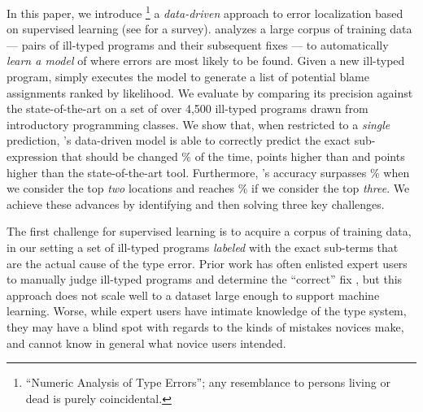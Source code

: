 %
In this paper, we introduce \toolname
\footnote{``Numeric Analysis of Type Errors''; any resemblance to persons living or dead is purely coincidental.}
a \emph{data-driven} approach to error
localization based on supervised
learning (see \citealt{Kotsiantis2007-pj} for a survey).
%
\toolname analyzes a large corpus
of training data --- pairs of ill-typed
programs and their subsequent fixes ---
to automatically \emph{learn a model}
of where errors are most likely to
be found.
%
Given a new ill-typed program,
\toolname simply executes the model
to generate a list of potential
blame assignments ranked by likelihood.
%
We evaluate \toolname by comparing its
precision against the state-of-the-art
on a set of over 4,500 ill-typed \ocaml
programs drawn from introductory
programming classes.
%
We show that, when restricted to a
\emph{single} prediction, \toolname's data-driven
model is able to correctly predict
the exact sub-expression that should
be changed \HiddenFhTopOne\% of the time,
\ToolnameWinOcaml points higher than \ocaml and
\ToolnameWinSherrloc points higher than the state-of-the-art
\sherrloc tool.
%
Furthermore, \toolname's accuracy surpasses
\HiddenFhTopTwo\% when we consider the top \emph{two}
locations and reaches \HiddenFhTopThree\% if we consider
the top \emph{three}.
%
We achieve these advances by identifying
and then solving three key challenges.

%
The first challenge for supervised learning
is to acquire a corpus of training data, in our setting
a set of ill-typed programs \emph{labeled}
with the exact sub-terms that are the actual
cause of the type error.
%
Prior work has often enlisted expert users
to manually judge ill-typed programs and
determine the ``correct'' fix
\citep[\eg][]{Lerner2007-dt,Loncaric2016-uk},
but this approach does not scale well to
a dataset large enough to support machine
learning.
%
Worse, while expert users have intimate
knowledge of the type system, they may
have a blind spot with regards to the
kinds of mistakes novices make, and
cannot know in general what novice users
intended.

